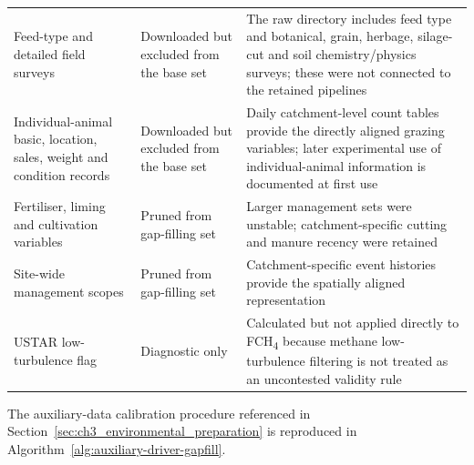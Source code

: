 {\begin{longtable}{p{3.5cm}p{3.0cm}p{8.0cm}}
Feed-type and detailed field surveys & Downloaded but excluded from the base set & The raw directory includes feed type and botanical, grain, herbage, silage-cut and soil chemistry/physics surveys; these were not connected to the retained pipelines \\
Individual-animal basic, location, sales, weight and condition records & Downloaded but excluded from the base set & Daily catchment-level count tables provide the directly aligned grazing variables; later experimental use of individual-animal information is documented at first use \\
Fertiliser, liming and cultivation variables & Pruned from gap-filling set & Larger management sets were unstable; catchment-specific cutting and manure recency were retained \\
Site-wide management scopes & Pruned from gap-filling set & Catchment-specific event histories provide the spatially aligned representation \\
USTAR low-turbulence flag & Diagnostic only & Calculated but not applied directly to FCH\textsubscript{4} because methane low-turbulence filtering is not treated as an uncontested validity rule \\
\end{longtable}
}
\fi

The auxiliary-data calibration procedure referenced in
Section~\ref{sec:ch3_environmental_preparation} is reproduced in
Algorithm~\ref{alg:auxiliary-driver-gapfill}.

